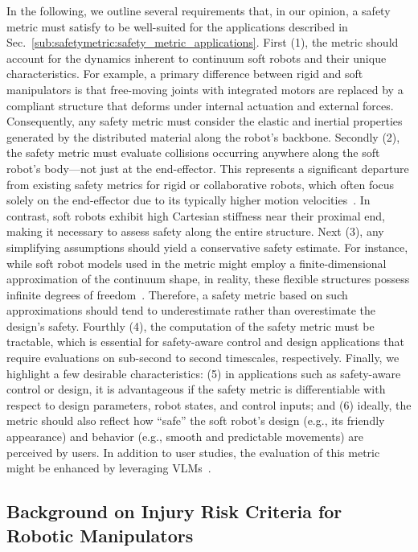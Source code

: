 In the following, we outline several requirements that, in our opinion, a safety metric must satisfy to be well-suited for the applications described in Sec.~\ref{sub:safetymetric:safety_metric_applications}. First (1), the metric should account for the dynamics inherent to continuum soft robots and their unique characteristics. For example, a primary difference between rigid and soft manipulators is that free-moving joints with integrated motors are replaced by a compliant structure that deforms under internal actuation and external forces. Consequently, any safety metric must consider the elastic and inertial properties generated by the distributed material along the robot’s backbone.
%
Secondly (2), the safety metric must evaluate collisions occurring anywhere along the soft robot’s body—not just at the end-effector. This represents a significant departure from existing safety metrics for rigid or collaborative robots, which often focus solely on the end-effector due to its typically higher motion velocities~\citep{haddadin2009requirements, haddadin2011safe, Isots_15066_2016}. In contrast, soft robots exhibit high Cartesian stiffness near their proximal end, making it necessary to assess safety along the entire structure.
% 
Next (3), any simplifying assumptions should yield a conservative safety estimate. For instance, while soft robot models used in the metric might employ a finite-dimensional approximation of the continuum shape, in reality, these flexible structures possess infinite degrees of freedom~\citep{della2023model, armanini2023soft}. Therefore, a safety metric based on such approximations should tend to underestimate rather than overestimate the design’s safety.
% 
Fourthly (4), the computation of the safety metric must be tractable, which is essential for safety-aware control and design applications that require evaluations on sub-second to second timescales, respectively.
% 
Finally, we highlight a few desirable characteristics: (5) in applications such as safety-aware control or design, it is advantageous if the safety metric is differentiable with respect to design parameters, robot states, and control inputs; and (6) ideally, the metric should also reflect how “safe” the soft robot’s design (e.g., its friendly appearance) and behavior (e.g., smooth and predictable movements) are perceived by users. In addition to user studies, the evaluation of this metric might be enhanced by leveraging \glspl{VLM}~\citep{touvron2023llama, grattafiori2024llama}.

\subsection{Background on Injury Risk Criteria for Robotic Manipulators}

